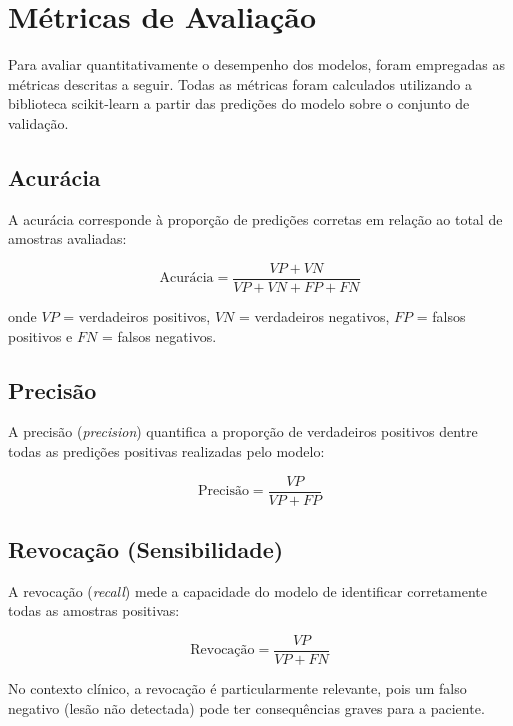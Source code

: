 \documentclass[12pt, a4paper]{article}
\begin{document}
\section{Métricas de Avaliação}

Para avaliar quantitativamente o desempenho dos modelos, foram empregadas as métricas descritas a seguir. Todas as métricas foram calculados utilizando a biblioteca scikit-learn a partir das predições do modelo sobre o conjunto de validação.

\subsection{Acurácia}

A acurácia corresponde à proporção de predições corretas em relação ao total de amostras avaliadas:

\begin{equation}
    \text{Acurácia} = \frac{VP + VN}{VP + VN + FP + FN}
\end{equation}

onde $VP$ = verdadeiros positivos, $VN$ = verdadeiros negativos, $FP$ = falsos positivos e $FN$ = falsos negativos.

\subsection{Precisão}

A precisão (\textit{precision}) quantifica a proporção de verdadeiros positivos dentre todas as predições positivas realizadas pelo modelo:

\begin{equation}
    \text{Precisão} = \frac{VP}{VP + FP}
\end{equation}

\subsection{Revocação (Sensibilidade)}

A revocação (\textit{recall}) mede a capacidade do modelo de identificar corretamente todas as amostras positivas:

\begin{equation}
    \text{Revocação} = \frac{VP}{VP + FN}
\end{equation}

No contexto clínico, a revocação é particularmente relevante, pois um falso negativo (lesão não detectada) pode ter consequências graves para a paciente.
\end{document}
